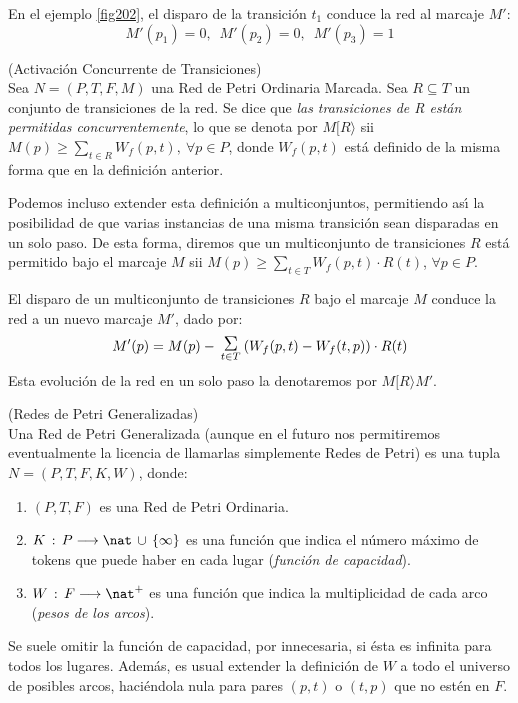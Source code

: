 \begin{example} En el ejemplo \ref{fig202}, el disparo de la transici\'{o}n $t_1$
conduce la red al marcaje $M'$:
\[ M'(p_1) = 0,\,\,\,M'(p_2)=0,\,\,\,M'(p_3)=1 \]
\end{example}

\begin{definition} (Activaci\'{o}n Concurrente de Transiciones)\\
Sea $N= (P,T,F,M)$ una Red de Petri Ordinaria Marcada. Sea
$R \subseteq T$ un conjunto de transiciones de la red.
Se dice que {\it las transiciones de R est\'{a}n permitidas
concurrentemente}, lo que se denota por $M [ R \rangle$
sii $M(p) \geq \sum_{t \in R} W_f(p,t),~
\forall p\in P$, donde
$W_f(p,t)$ est\'{a} definido de la misma forma que en la definici\'{o}n anterior.

Podemos incluso extender esta definici\'{o}n a multiconjuntos,
permitiendo as\'{\i} la posibilidad de que varias instancias de una
misma transici\'{o}n sean disparadas en un solo paso.
De esta forma, diremos que un multiconjunto de transiciones
$R$ est\'{a} permitido bajo el marcaje $M$ sii $M(p)
\geq \sum_{t \in T} W_f(p,t) \cdot R(t)$, $\forall p \in P$.

El disparo de un multiconjunto de transiciones $R$ bajo el
marcaje $M$ conduce la red a un nuevo marcaje $M'$, dado por:
\[ M'(p) = M(p) - \sumas{t \in T} (W_f(p,t) - W_f(t,p)) \cdot R(t)\]
Esta evoluci\'{o}n de la red en un solo paso la denotaremos por
$M[ R \rangle M'$.
\end{definition}

\begin{definition} (Redes de Petri Generalizadas)\\
Una Red de Petri Generalizada (aunque en el futuro nos permitiremos
eventualmente la licencia de llamarlas simplemente Redes de Petri)
es una tupla $N=(P,T,F,K,W)$, donde:
\begin{enumerate}
\item $(P,T,F)$ es una Red de Petri Ordinaria.
\item $K\,:\,P \longrightarrow \nat \,\cup\, \{\infty\}$ es una
funci\'{o}n que indica el n\'{u}mero m\'{a}ximo de tokens que puede haber en
cada lugar ({\it funci\'{o}n de capacidad}).
\item $W\,:\,F \longrightarrow \nat^{+}$ es una funci\'{o}n que
indica la multiplicidad de cada arco ({\it pesos de los arcos}).
\end{enumerate}

Se suele omitir la funci\'{o}n de capacidad, por innecesaria,
si \'{e}sta es infinita para todos los lugares. Adem\'{a}s, es
usual extender la definici\'{o}n de $W$ a todo el universo de
posibles arcos, haci\'{e}ndola nula para pares
$(p,t)$ o $(t,p)$ que no est\'{e}n en $F$.
\end{definition}

